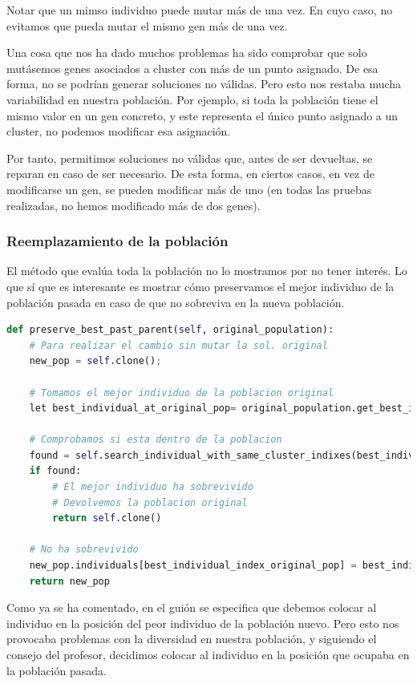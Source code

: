 \documentclass[11pt]{article}
\begin{document}
Notar que un mimso individuo puede mutar más de una vez. En cuyo caso, no evitamos que pueda mutar el mismo gen más de una vez.

Una cosa que nos ha dado muchos problemas ha sido comprobar que solo mutásemos genes asociados a cluster con más de un punto asignado. De esa forma, no se podrían generar soluciones no válidas. Pero esto nos restaba mucha variabilidad en nuestra población. Por ejemplo, si toda la población tiene el mismo valor en un gen concreto, y este representa el único punto asignado a un cluster, no podemos modificar esa asignación.

Por tanto, permitimos soluciones no válidas que, antes de ser devueltas, se reparan en caso de ser necesario. De esta forma, en ciertos casos, en vez de modificarse un gen, se pueden modificar más de uno (en todas las pruebas realizadas, no hemos modificado más de dos genes).

\subsubsection{Reemplazamiento de la población}

El método que evalúa toda la población no lo mostramos por no tener interés. Lo que sí que es interesante es mostrar cómo preservamos el mejor individuo de la población pasada en caso de que no sobreviva en la nueva población.

\begin{lstlisting}[language=Python, style=Boxed]
def preserve_best_past_parent(self, original_population):
    # Para realizar el cambio sin mutar la sol. original
    new_pop = self.clone();

    # Tomamos el mejor individuo de la poblacion original
    let best_individual_at_original_pop= original_population.get_best_individual();

    # Comprobamos si esta dentro de la poblacion
    found = self.search_individual_with_same_cluster_indixes(best_individual_at_original_pop)
    if found:
        # El mejor individuo ha sobrevivido
        # Devolvemos la poblacion original
        return self.clone()

    # No ha sobrevivido
    new_pop.individuals[best_individual_index_original_pop] = best_individual_at_original_pop
    return new_pop
\end{lstlisting}

Como ya se ha comentado, en el guión se especifica que debemos colocar al individuo en la posición del peor individuo de la población nuevo. Pero esto nos provocaba problemas con la diversidad en nuestra población, y siguiendo el consejo del profesor, decidimos colocar al individuo en la posición que ocupaba en la población pasada.
\end{document}
